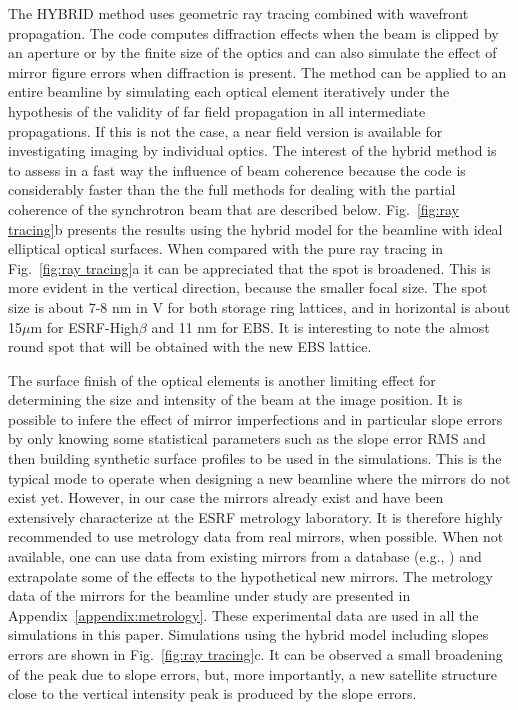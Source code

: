 \documentclass{iucr}              %
\begin{document}
The HYBRID method \cite{hybrid} uses geometric ray tracing combined with wavefront propagation. The code computes diffraction effects when the beam is clipped by an aperture or by the finite size of the optics and can also simulate the effect of mirror figure errors when diffraction is present. The method can be applied to an entire beamline by simulating each optical element iteratively under the hypothesis of the validity of far field propagation in all intermediate propagations. If this is not the case, a near field version is available for investigating imaging by individual optics. The interest of the hybrid method is to assess in a fast way the influence of beam coherence because the code is considerably faster than the the full methods for dealing with the partial coherence of the synchrotron beam that are described below. Fig.~\ref{fig:ray tracing}b presents the results using the hybrid model for the beamline with ideal elliptical optical surfaces. When compared with the pure ray tracing in Fig.~\ref{fig:ray tracing}a it can be appreciated that the spot is broadened. This is more evident in the vertical direction, because the smaller focal size. The spot size is about 7-8 nm in V for both storage ring lattices, and in horizontal is about 15$\mu$m for ESRF-High$\beta$ and 11 nm for EBS. It is interesting to note the almost round spot that will be obtained with the new EBS lattice. 

The surface finish of the optical elements is another limiting effect for determining the size and intensity of the beam at the image position. It is possible to infere the effect of mirror imperfections and in particular slope errors by only knowing some statistical parameters such as the slope error RMS and then building synthetic surface profiles to be used in the simulations. This is the typical mode to operate when designing a new beamline where the mirrors do not exist yet. However, in our case the mirrors already exist and have been extensively characterize at the ESRF metrology laboratory. It is therefore highly recommended to use metrology data from real mirrors, when possible. When not available, one can use data from existing mirrors from a database (e.g., \cite{dabam}) and extrapolate some of the effects to the hypothetical new mirrors. The metrology data of the mirrors for the beamline under study are presented in Appendix~\ref{appendix:metrology}. These experimental data are used in all the simulations in this paper. Simulations using the hybrid model including slopes errors are shown in Fig.~\ref{fig:ray tracing}c. It can be observed a small broadening of the peak due to slope errors, but, more importantly, a new satellite structure close to the vertical intensity peak is produced by the slope errors. 
\end{document}

